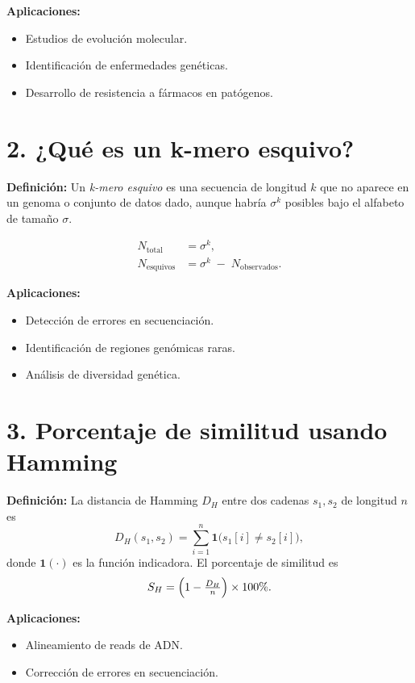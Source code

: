\documentclass[fleqn,10pt]{article}
\begin{document}
\textbf{Aplicaciones:}
\begin{itemize}
    \item Estudios de evolución molecular.
    \item Identificación de enfermedades genéticas.
    \item Desarrollo de resistencia a fármacos en patógenos.
\end{itemize}

\section*{2. ¿Qué es un k-mero esquivo?}
\textbf{Definición:}  
Un \emph{k-mero esquivo} es una secuencia de longitud \(k\) que no aparece en un genoma o conjunto de datos dado, aunque habría \(\sigma^k\) posibles bajo el alfabeto de tamaño \(\sigma\).

\medskip
\begin{align}
N_{\mathrm{total}} &= \sigma^k,\\
N_{\mathrm{esquivos}} &= \sigma^k \;-\; N_{\mathrm{observados}}.
\end{align}

\textbf{Aplicaciones:}
\begin{itemize}
    \item Detección de errores en secuenciación.
    \item Identificación de regiones genómicas raras.
    \item Análisis de diversidad genética.
\end{itemize}

\section*{3. Porcentaje de similitud usando Hamming}
\textbf{Definición:}  
La distancia de Hamming \(D_H\) entre dos cadenas \(s_1,s_2\) de longitud \(n\) es
\[
D_H(s_1,s_2)
= \sum_{i=1}^{n} \mathbf{1}\bigl(s_1[i]\neq s_2[i]\bigr),
\]
donde \(\mathbf{1}(\cdot)\) es la función indicadora.  
El porcentaje de similitud es
\[
S_H = \Bigl(1 - \tfrac{D_H}{n}\Bigr)\times 100\%.
\]

\textbf{Aplicaciones:}
\begin{itemize}
    \item Alineamiento de reads de ADN.
    \item Corrección de errores en secuenciación.
\end{itemize}
\end{document}
